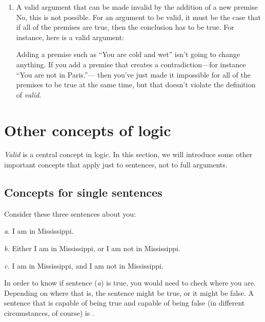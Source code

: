 \begin{enumerate}[(1)]
\item A valid argument that can be made invalid by the addition of a new premise\\
No, this is not possible. For an argument to be valid, it must be the case that if all of the premises are true, then the conclusion has to be true. For instance, here is a valid argument:
Adding a premise such as ``You are cold and wet'' isn't going to change anything.
If you add a premise that creates a contradiction---for instance ``You are not in Paris.''---
then you've just made it impossible for all of the premises to be true at the same time, but that doesn't violate the definition of \textit{valid}. 


\end{enumerate}




\chapter{Other concepts of logic}\label{s:BasicNotions}

\textit{Valid} is a central concept in logic. In this section, we will introduce some other important concepts that apply just to sentences, not to full arguments. 

\section{Concepts for single sentences}\label{s:nec-truth}

Consider these three sentences about you:
	\begin{earg}
		\item[\textit{a.}] I am in Mississippi.
		\item[\textit{b.}] Either I am in Mississippi, or I am not in Mississippi.
		\item[\textit{c.}] I am in Mississippi, and I am not in Mississippi.
	\end{earg}
In order to know if sentence (\textit{a}) is true, you would need to check where you are. Depending on where that is, the sentence might be true, or it might be false. A sentence that is capable of being true and capable of being false (in different circumstances, of course) is .

